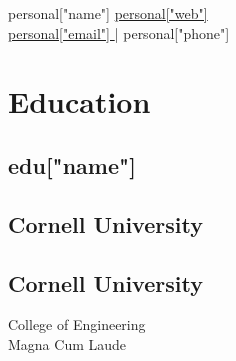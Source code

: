 \documentclass[]{cv}
\begin{document}
    
    \lastupdated
    

    \namesection
    {
        {{ personal["name"] }}
    }
    { 
        \href{ {{personal["url"]}} }{ {{personal["web"]}} } \\
        \href{mailto:{{personal["email"]}}}{ {{personal["email"]}} } | {{personal["phone"]}}
    }
    
    
    \begin{minipage}[t]{0.33\textwidth} 
    
    
    \section{Education} 
    
  {%
  \subsection{ {{ edu["name"] }} }
  {%
  {%
  \sectionsep
  {%

    \subsection{Cornell University}
    \sectionsep
    
    \subsection{Cornell University}
    College of Engineering \\
    Magna Cum Laude\\
    \sectionsep
    
}}}}
\end{minipage}
\end{document}
